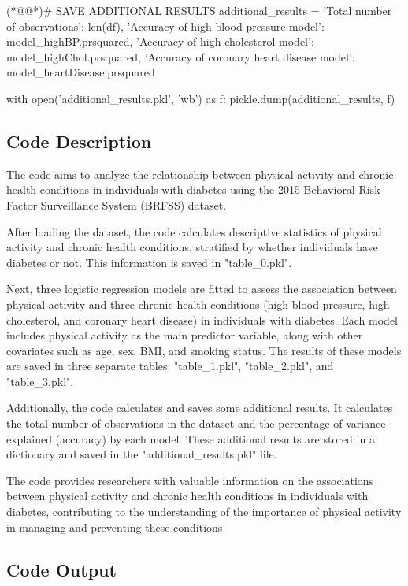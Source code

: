 \documentclass[11pt]{article}
\begin{document}
\begin{python}
(*@@*)# SAVE ADDITIONAL RESULTS
additional_results = {
 'Total number of observations': len(df),
 'Accuracy of high blood pressure model': model_highBP.prsquared,
 'Accuracy of high cholesterol model': model_highChol.prsquared,
 'Accuracy of coronary heart disease model': model_heartDisease.prsquared
}

with open('additional_results.pkl', 'wb') as f:
 pickle.dump(additional_results, f)

\end{python}

\subsection{Code Description}

The code aims to analyze the relationship between physical activity and chronic health conditions in individuals with diabetes using the 2015 Behavioral Risk Factor Surveillance System (BRFSS) dataset.

After loading the dataset, the code calculates descriptive statistics of physical activity and chronic health conditions, stratified by whether individuals have diabetes or not. This information is saved in "table\_0.pkl".

Next, three logistic regression models are fitted to assess the association between physical activity and three chronic health conditions (high blood pressure, high cholesterol, and coronary heart disease) in individuals with diabetes. Each model includes physical activity as the main predictor variable, along with other covariates such as age, sex, BMI, and smoking status. The results of these models are saved in three separate tables: "table\_1.pkl", "table\_2.pkl", and "table\_3.pkl".

Additionally, the code calculates and saves some additional results. It calculates the total number of observations in the dataset and the percentage of variance explained (accuracy) by each model. These additional results are stored in a dictionary and saved in the "additional\_results.pkl" file.

The code provides researchers with valuable information on the associations between physical activity and chronic health conditions in individuals with diabetes, contributing to the understanding of the importance of physical activity in managing and preventing these conditions.

\subsection{Code Output}\hypertarget{file-table-0-pkl}{}
\end{document}
